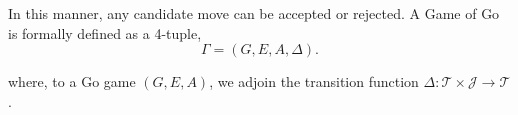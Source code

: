 In this manner, any candidate move can be accepted or rejected. A Game of Go is formally defined as a 4-tuple,
$$\Gamma = (G, E, A, \Delta).$$
	
where, to a Go game $(G, E, A)$, we adjoin the transition function $\Delta: \mathcal{T} \times \mathcal{J} \to \mathcal{T}$.
%	

